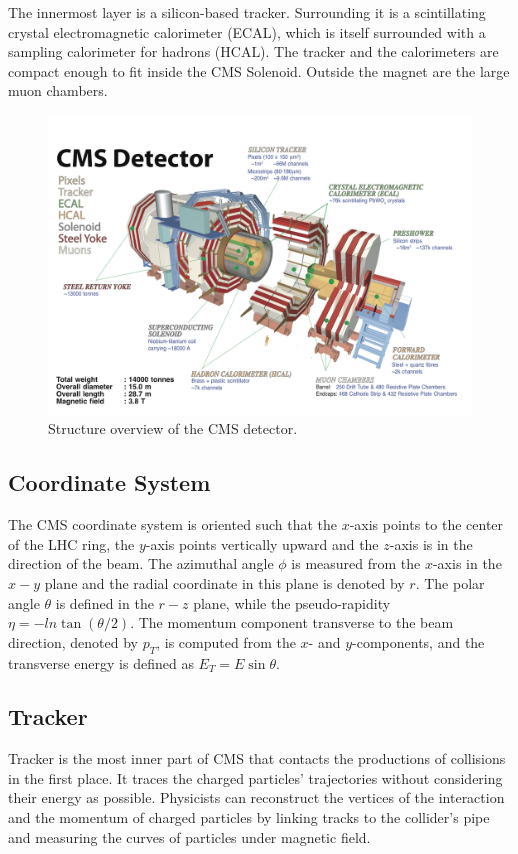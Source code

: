 The innermost layer is a silicon-based tracker. Surrounding it is a scintillating crystal electromagnetic calorimeter (ECAL), which is itself surrounded with a sampling calorimeter for hadrons (HCAL). The tracker and the calorimeters are compact enough to fit inside the CMS Solenoid. Outside the magnet are the large muon chambers.

\begin{figure}[hbtp]
  \begin{center}
    \includegraphics[width=\textwidth]{figure/CH2/CMS.png}
  \end{center}
  \caption{\label{fig:CMS}Structure overview of the CMS detector.}
\end{figure}
\subsection*{Coordinate System}

The CMS coordinate system is oriented such that the $x$-axis points to the center of the LHC ring, the $y$-axis points vertically upward and the $z$-axis is in the direction of the beam. The azimuthal angle $\phi$ is measured from the $x$-axis in the $x-y$ plane and the radial coordinate in this plane is denoted by $r$. The polar angle $\theta$ is defined in the $r-z$ plane, while the pseudo-rapidity $\eta = -ln\tan{(\theta/2)}$. The momentum component transverse to the beam direction, denoted by $p_{T}$, is computed from the $x$- and $y$-components, and the transverse energy is defined as $E_{T} = E\sin\theta$.

\subsection{Tracker}
Tracker is the most inner part of CMS that contacts the productions of collisions in the first place. It traces the charged particles' trajectories without considering their energy as possible. Physicists can reconstruct the vertices of the interaction and the momentum of charged particles by linking tracks to the collider's pipe and measuring the curves of particles under magnetic field.


